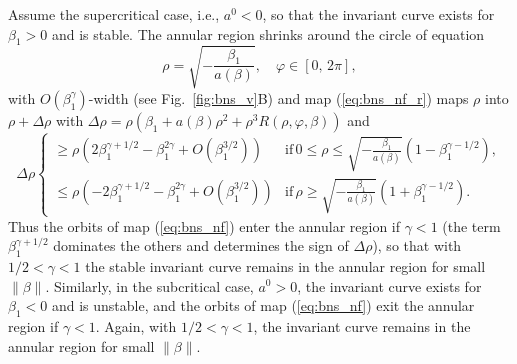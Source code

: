 \documentclass[final,onefignum]{siamltex}
\begin{document}
Assume the supercritical case, i.e., $a^0<0$, so that the
invariant curve exists for $\beta_1>0$ and is stable.
The annular region shrinks around the circle of equation
\begin{equation}
\label{eq:bns_cir}
\rho=\sqrt{-{\displaystyle \frac{\displaystyle {\beta_1}}{\displaystyle {a(\beta)}}}},\quad \varphi\in[0,\,2\pi],
\end{equation}
with $O(\beta_1^\gamma)$-width (see Fig.~\ref{fig:bns_v}B) and map (\ref{eq:bns_nf_r}) maps $\rho$ into $\rho+\Delta\rho$ with
$\Delta\rho=\rho(\beta_1+a(\beta)\rho^2+\rho^3 R(\rho,\varphi,\beta))$ and
$$
\Delta\rho
\left\{\begin{array}{ll}
\ge\rho(2\beta_1^{\gamma+1/2}-\beta_1^{2\gamma}+O(\beta_1^{3/2})) &
\mathrm{if}\,0\le\rho\le
\sqrt{-{\displaystyle \frac{\displaystyle {\beta_1}}{\displaystyle {a(\beta)}}}}(1-\beta_1^{\gamma-1/2}),\\[2mm]
\le\rho(-2\beta_1^{\gamma+1/2}-\beta_1^{2\gamma}+O(\beta_1^{3/2})) &
\mathrm{if}\,\rho\ge
\sqrt{-{\displaystyle \frac{\displaystyle {\beta_1}}{\displaystyle {a(\beta)}}}}(1+\beta_1^{\gamma-1/2}).
\end{array}\right.
$$
Thus the orbits of map (\ref{eq:bns_nf}) enter the annular region if
$\gamma<1$ (the term $\beta_1^{\gamma+1/2}$ dominates the others and determines the sign of $\Delta\rho$), so that with $1/2<\gamma<1$ the stable invariant curve remains
in the annular region for small $\|\beta\|$.
Similarly, in the subcritical case, $a^0>0$, the
invariant curve exists for $\beta_1<0$ and is unstable, and the
orbits of map (\ref{eq:bns_nf}) exit the annular region if $\gamma<1$.
Again, with $1/2<\gamma<1$, the invariant curve remains
in the annular region for small $\|\beta\|$.
\end{document}
